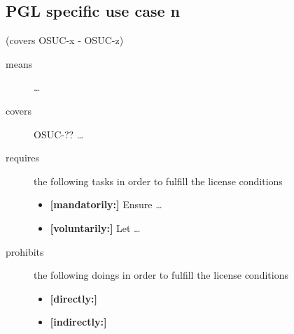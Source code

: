 \subsection{PGL specific use case n}
(covers OSUC-x - OSUC-z)
\begin{description}
\item[means] \ldots

\item[covers] OSUC-?? \ldots

\item[requires] the following tasks in order to fulfill the license conditions
\begin{itemize}
  \item \textbf{[mandatorily:]} Ensure \ldots
  \item \textbf{[voluntarily:]} Let \ldots
\end{itemize}

\item[prohibits] the following doings in order to fulfill the license conditions
\begin{itemize}
  \item \textbf{[directly:]} 
  \item \textbf{[indirectly:]}
\end{itemize}
\end{description}

%
